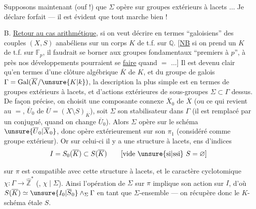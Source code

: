 Supposons maintenant (ouf !) que
\(\Sigma\) opère sur groupes extérieurs à lacets \(\ldots\)
Je déclare forfait --- il est évident que
tout marche bien !

B. \uline{Retour au cas arithmétique}, si on
veut décrire en termes ``galoisiens'' des
couples \((X,S)\)  anabéliens  sur un corps
\(K\) de t.f. sur \(\mathbb Q\). [\uline{NB} si on prend
un \(K\) de t.f. sur \(\mathbb F_p\), il faudrait se
borner aux groupes fondamentaux ``premiers à
\(p\)'', à  près nos développements pourraient
se \uline{faire} quand \(=\) \(\ldots\)]
Il est devenu clair qu'en termes d'une
clôture algébrique \(\overline K\) de \(K\), et du
groupe de galois  \(\Gamma=\operatorname{Gal}(\overline K/\unsure{K|k})\), la
description la plus simple est en
termes de groupes extérieurs à lacets, et
d'actions extérieures de sous-groupes  \(\Sigma\subset\Gamma\)
dessus. De façon précise,  on
choisit une composante connexe
\(\overline X_0\) de \(\overline X\) (ou ce qui revient au \(=\),
\(\overline U_0\) de \(\overline U=(X\setminus S)_{\overline K}\)), soit \(\Sigma\) son
stabilisateur dans \(\Gamma\) (il est remplacé
par un conjugué, quand on change
\(\overline U_0\)). Alors \(\Sigma\) opère sur le schéma
\(\unsure{\overline U_0|\overline X_0}\), donc opère extérieurement sur son
\(\pi_1\) (considéré comme groupe extérieur).
Or sur celui-ci il y a une structure
à lacets,  ens d'indices
\[
I=S_0(\overline K)\subset S(\overline K)
\qquad[\text{vide \unsure{si|ssi} }S=\varnothing]
\]

   sur $\pi$ est
compatible avec cette structure à lacets,
et le caractère cyclotomique $\chi:\Gamma\to\widehat{\mathbb Z}^{*}$
(, $\chi\mid\Sigma$). Ainsi l'opération de
$\Sigma$ sur $\pi$ implique son action sur $I$, d'où
$S(\overline K)\simeq\unsure{I_0|\overline S_0}\wedge_{\Sigma}\Gamma$ en tant que $\Sigma$-ensemble
--- on récupère donc le $K$-schéma étale $S$.

